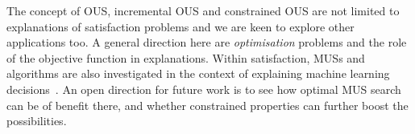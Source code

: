 The concept of OUS, incremental OUS and constrained OUS are not limited to explanations of satisfaction problems and we are keen to explore other applications too. A general direction here are \textit{optimisation} problems and the role of the objective function in explanations.
Within satisfaction, MUSs and \hitsetbased algorithms are also investigated in the context of explaining machine learning decisions~\cite{ignatiev2019abduction}. An open direction for future work is to see how optimal MUS search can be of benefit there, and whether constrained properties can further boost the possibilities.







